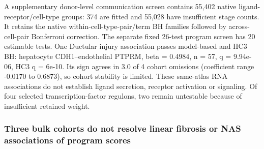 A supplementary donor-level communication screen contains 55,402 native ligand-receptor/cell-type groups: 374 are fitted and 55,028 have insufficient stage counts. It retains the native within-cell-type-pair/term BH families followed by across-cell-pair Bonferroni correction. The separate fixed 26-test program screen has 20 estimable tests. One Ductular injury association passes model-based and HC3 BH: hepatocyte CDH1--endothelial PTPRM, beta = 0.4984, n = 57, q = 9.94e-06, HC3 q = 6e-10. Its sign agrees in 3.0 of 4 cohort omissions (coefficient range -0.0170 to 0.6873), so cohort stability is limited. These same-atlas RNA associations do not establish ligand secretion, receptor activation or signaling. Of four selected transcription-factor regulons, two remain untestable because of insufficient retained weight.

\subsubsection{Three bulk cohorts do not resolve linear fibrosis or NAS associations of program scores}\label{three-bulk-cohorts-do-not-resolve-linear-fibrosis-or-nas-associations-of-program-scores}

